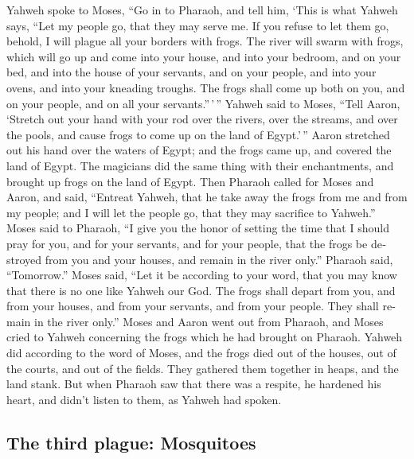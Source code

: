 \begin{paracol}{2}
\begin{otherlanguage}{english}
 Yahweh spoke to Moses, ``Go in to Pharaoh, and tell him,
`This is what Yahweh says, ``Let my people go, that they may serve me.
 If you refuse to let them go, behold, I will plague all
your borders with frogs.  The river will swarm with frogs,
which will go up and come into your house, and into your bedroom, and on
your bed, and into the house of your servants, and on your people, and
into your ovens, and into your kneading troughs.  The
frogs shall come up both on you, and on your people, and on all your
servants.''\,'\,''  Yahweh said to Moses, ``Tell Aaron,
`Stretch out your hand with your rod over the rivers, over the streams,
and over the pools, and cause frogs to come up on the land of
Egypt.'\,''  Aaron stretched out his hand over the waters
of Egypt; and the frogs came up, and covered the land of Egypt.
 The magicians did the same thing with their enchantments,
and brought up frogs on the land of Egypt.  Then Pharaoh
called for Moses and Aaron, and said, ``Entreat Yahweh, that he take
away the frogs from me and from my people; and I will let the people go,
that they may sacrifice to Yahweh.''  Moses said to
Pharaoh, ``I give you the honor of setting the time that I should pray
for you, and for your servants, and for your people, that the frogs be
destroyed from you and your houses, and remain in the river only.''
 Pharaoh said, ``Tomorrow.'' Moses said, ``Let it be
according to your word, that you may know that there is no one like
Yahweh our God.  The frogs shall depart from you, and
from your houses, and from your servants, and from your people. They
shall remain in the river only.''  Moses and Aaron went
out from Pharaoh, and Moses cried to Yahweh concerning the frogs which
he had brought on Pharaoh.  Yahweh did according to the
word of Moses, and the frogs died out of the houses, out of the courts,
and out of the fields.  They gathered them together in
heaps, and the land stank.  But when Pharaoh saw that
there was a respite, he hardened his heart, and didn't listen to them,
as Yahweh had spoken.

\hypertarget{the-third-plague-mosquitoes}{%
\subsection{The third plague:
Mosquitoes}\label{the-third-plague-mosquitoes}}


\end{otherlanguage}
\end{paracol}

